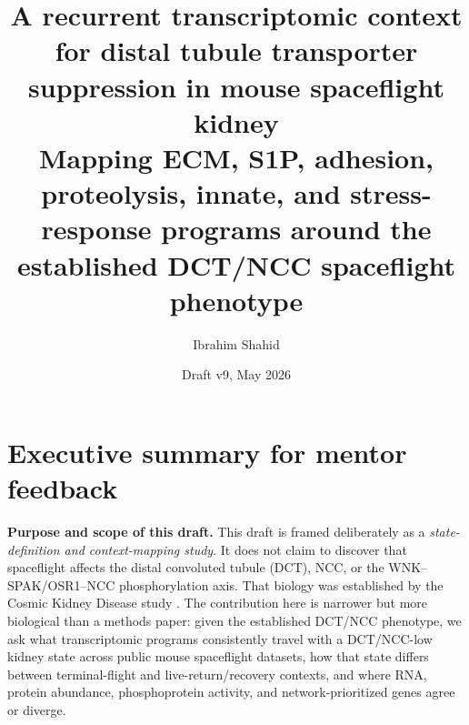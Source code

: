 \documentclass[11pt]{article}
\title{\textbf{A recurrent transcriptomic context for distal tubule transporter suppression in mouse spaceflight kidney}\\[0.35em]
\large Mapping ECM, S1P, adhesion, proteolysis, innate, and stress-response programs around the established DCT/NCC spaceflight phenotype}
\author{Ibrahim Shahid}
\affil{Independent research draft for mentor feedback\\Authorship/collaboration structure pending}
\date{Draft v9, May 2026}
\begin{document}
\maketitle

\section*{Executive summary for mentor feedback}

\noindent\textbf{Purpose and scope of this draft.} This draft is framed deliberately as a \emph{state-definition and context-mapping study}. It does not claim to discover that spaceflight affects the distal convoluted tubule (DCT), NCC, or the WNK--SPAK/OSR1--NCC phosphorylation axis. That biology was established by the Cosmic Kidney Disease study \citep{siew2024cosmic}. The contribution here is narrower but more biological than a methods paper: given the established DCT/NCC phenotype, we ask what transcriptomic programs consistently travel with a DCT/NCC-low kidney state across public mouse spaceflight datasets, how that state differs between terminal-flight and live-return/recovery contexts, and where RNA, protein abundance, phosphoprotein activity, and network-prioritized genes agree or diverge.
\end{document}
